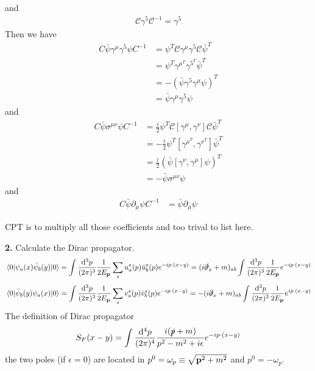 \documentclass{article}
\newcommand{\intphead}[1]{\int\frac{\dd^3#1}{(2\pi)^3}}
\newcommand{\gm}{\gamma^{\mu}}
\newcommand{\gn}{\gamma^{\nu}}
\newcommand{\vbp}{\vb{p}}
\newcommand{\g}{\gamma}
\newcommand{\s}{\sigma}
\newcommand{\pars}{\slashed\partial}
\newcommand{\ps}{\slashed p}
\newcommand{\Cscr}{\mathscr{C}}
\begin{document}
and
\begin{align*}
  \Cscr\g^5\Cscr^{-1}=\g^5
\end{align*}
Then we have
\begin{align*}
  C\bar\psi\gm\g^5\psi C^{-1}&=\psi^T\Cscr\gm\g^5\Cscr\bar\psi^T\\
  &=\psi^T\gm^T\g^5^T\bar\psi^T\\
  &=-(\bar\psi\g^5\gm\psi)^T\\
  &=\bar\psi\gm\g^5\psi
\end{align*}
and
\begin{align*}
  C\bar\psi\s^{\mu\nu}\psi C^{-1}&=\frac{i}{2}\psi^T\Cscr[\gm,\gn]\Cscr\bar\psi^T\\
  &=-\frac{i}{2}\psi^T[\gm^T,\gn^T]\bar\psi^T\\
  &=\frac{i}{2}(\bar\psi[\gn,\gm]\psi)^T\\
  &=-\bar\psi\s^{\mu\nu}\psi
\end{align*}
and
\begin{align*}
  C\bar\psi\partial_{\mu}\psi C^{-1}&=\bar\psi\partial_{\mu}\psi
\end{align*}

CPT is to multiply all those coefficients and too trival to list here.

{\bf2.}\quad
Calculate the Dirac propagator.
$$\mel{0}{\psi_a(x)\bar\psi_b(y)}{0}=\intphead{p}\frac{1}{2E_{\vbp}}\sum_su^s_a(p)\bar u^s_b(p)e^{-ip\cdot(x-y)}=(i\pars_x+m)_{ab}\intphead{p}\frac{1}{2E_{\vbp}}e^{-ip\cdot(x-y)}$$
$$\mel{0}{\bar\psi_b(y)\psi_a(x)}{0}=\intphead{p}\frac{1}{2E_{\vbp}}\sum_sv^s_a(p)\bar v^s_b(p)e^{-ip\cdot(x-y)}=-(i\pars_x+m)_{ab}\intphead{p}\frac{1}{2E_{\vbp}}e^{ip\cdot(x-y)}$$
The definition of Dirac propagator
$$S_F(x-y)=\int\frac{\dd^4p}{(2\pi)^4}\frac{i(\ps+m)}{p^2-m^2+i\epsilon}e^{-ip\cdot(x-y)}$$
the two poles (if $\epsilon=0$) are located in $p^0=\omega_p\equiv\sqrt{\vbp^2+m^2}$ and $p^0=-\omega_p$.
\end{document}
